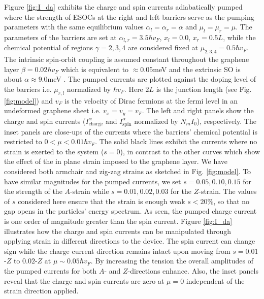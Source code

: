 \documentclass[doublecol]{epl2}
\begin{document}
Figure \ref{fig:I_da} exhibits the charge and spin currents
adiabatically pumped where the strength of ESOCs at the right and
left barriers serve as the pumping parameters with the same
equilibrium values $\alpha_l=\alpha_r=\alpha$ and
$\mu_{l}=\mu_{r}=\mu$. The parameters of the barriers are set at
$\alpha_{l,r}=3.5\hbar v_F$, $x_{l}=0.0$, $x_{r}=0.5L$, while the
chemical potential of regions $\gamma=2,3,4$ are considered fixed at
${\mu}_{2,3,4}=0.5\hbar v_F$. The intrinsic spin-orbit coupling is
assumed constant throughout the graphene layer $\beta=0.02\hbar v_F$
which is equivalent to $\approx 0.05$meV and the extrinsic SO is
about $\alpha \approx 9.0$meV\cite{so_exp1,so_exp2}
. The pumped currents are plotted against the doping level of the
barriers i.e. $\mu_{r,l}$ normalized by $\hbar v_F$. Here $2L$ is
the junction length (see Fig. \ref{fig:model}) and $v_F$ is the
velocity of Dirac fermions at the fermi level in an undeformed
graphene sheet i.e. $v_x=v_y=v_F$. The left and right panels show
the charge and spin currents ($I_\text{charge}^{\alpha}$ and
$I_\text{spin}^{\alpha}$ normalized by $N_mI_0$), respectively. The
inset panels are close-ups of the currents where the barriers'
chemical potential is restricted to $0<\mu<0.01\hbar v_F$. The solid
black lines exhibit the currents where no strain is exerted to the
system ($s=0$), in contrast to the other curves which show the
effect of the in plane strain imposed to the graphene layer. We have
considered both armchair and zig-zag strains as sketched in Fig.
\ref{fig:model}. To have similar magnitudes for the pumped currents,
we set $s=0.05,0.10,0.15$ for the strength of the $A$-strain while
$s=0.01,0.02,0.03$ for the $Z$-strain. The values of $s$ considered
here ensure that the strain is enough weak $s<20\%$, so that no gap
opens in the particles' energy
spectrum\cite{cite:choi1,aldst_prb_strain,cite:soodchomshom,Covaci}.
As seen, the pumped charge current is one order of magnitude greater
than the spin current. Figure \ref{fig:I_da} illustrates how the
charge and spin currents can be manipulated through applying strain
in different directions to the device. The spin current can change
sign while the charge current direction remains intact upon moving
from $s=0.01$-$Z$ to $0.02$-$Z$ at $\mu\sim 0.05\hbar v_F$. By
increasing the tension the overall amplitudes of the pumped currents
for both $A$- and $Z$-directions enhance.  Also, the inset panels
reveal that the charge and spin currents are zero at $\mu=0$
independent of the strain direction applied.
\end{document}
